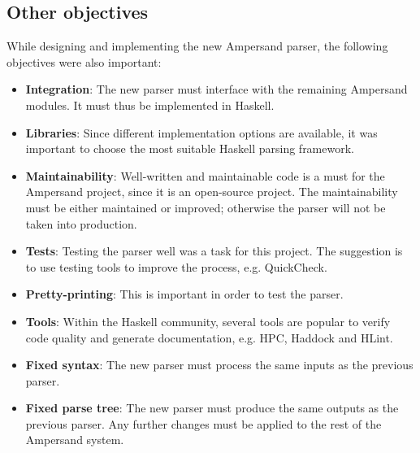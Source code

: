 
\subsection{Other objectives}
While designing and implementing the new Ampersand parser, the following objectives were also important:
\begin{itemize}
  \item \textbf{Integration}: The new parser must interface with the remaining Ampersand modules.
    It must thus be implemented in Haskell.
  \item \textbf{Libraries}: Since different implementation options are available, it was important to choose the most suitable Haskell parsing framework.
  \item \textbf{Maintainability}: Well-written and maintainable code is a must for the Ampersand project, since it is an open-source project.
    The maintainability must be either maintained or improved; otherwise the parser will not be taken into production.
  \item \textbf{Tests}: Testing the parser well was a task for this project.
    The suggestion is to use testing tools to improve the process, e.g. QuickCheck.
  \item \textbf{Pretty-printing}: This is important in order to test the parser.
%
%
%
  \item \textbf{Tools}: Within the Haskell community, several tools are popular to verify code quality and generate documentation, e.g. HPC, Haddock and HLint.
  \item \textbf{Fixed syntax}: The new parser must process the same inputs as the previous parser.
  \item \textbf{Fixed parse tree}: The new parser must produce the same outputs as the previous parser.
    Any further changes must be applied to the rest of the Ampersand system.
\end{itemize}

